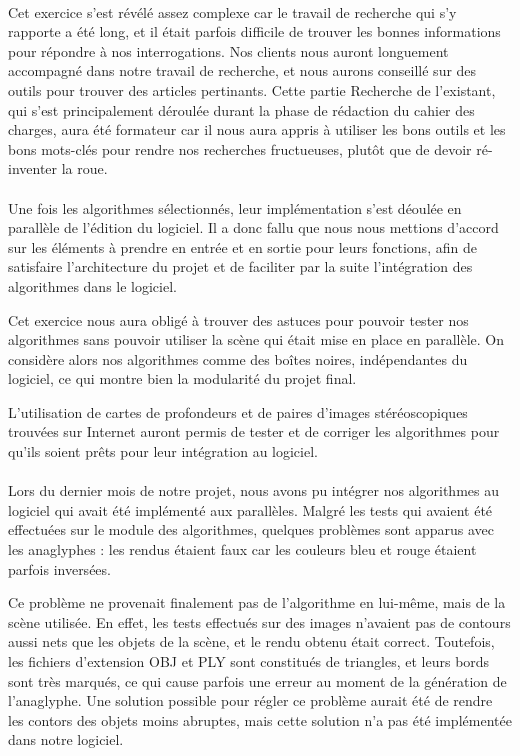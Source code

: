 \paragraph{}
Cet exercice s'est révélé assez complexe car le travail de recherche qui s'y rapporte a été long, et il était parfois difficile de trouver les bonnes informations pour répondre à nos interrogations. Nos clients nous auront longuement accompagné dans notre travail de recherche, et nous aurons conseillé sur des outils pour trouver des articles pertinants. Cette partie Recherche de l'existant, qui s'est principalement déroulée durant la phase de rédaction du cahier des charges, aura été formateur car il nous aura appris à utiliser les bons outils et les bons mots-clés pour rendre nos recherches fructueuses, plutôt que de devoir ré-inventer la roue.

\paragraph{}
Une fois les algorithmes sélectionnés, leur implémentation s'est déoulée en parallèle de l'édition du logiciel. Il a donc fallu que nous nous mettions d'accord sur les éléments à prendre en entrée et en sortie pour leurs fonctions, afin de satisfaire l'architecture du projet et de faciliter par la suite l'intégration des algorithmes dans le logiciel.

Cet exercice nous aura obligé à trouver des astuces pour pouvoir tester nos algorithmes sans pouvoir utiliser la scène qui était mise en place en parallèle. On considère alors nos algorithmes comme des boîtes noires, indépendantes du logiciel, ce qui montre bien la modularité du projet final.

L'utilisation de cartes de profondeurs et de paires d'images stéréoscopiques trouvées sur Internet auront permis de tester et de corriger les algorithmes pour qu'ils soient prêts pour leur intégration au logiciel.

\paragraph{}
Lors du dernier mois de notre projet, nous avons pu intégrer nos algorithmes au logiciel qui avait été implémenté aux parallèles. Malgré les tests qui avaient été effectuées sur le module des algorithmes, quelques problèmes sont apparus avec les anaglyphes : les rendus étaient faux car les couleurs bleu et rouge étaient parfois inversées.

Ce problème ne provenait finalement pas de l'algorithme en lui-même, mais de la scène utilisée. En effet, les tests effectués sur des images n'avaient pas de contours aussi nets que les objets de la scène, et le rendu obtenu était correct. Toutefois, les fichiers d'extension OBJ et PLY sont constitués de triangles, et leurs bords sont très marqués, ce qui cause parfois une erreur au moment de la génération de l'anaglyphe. Une solution possible pour régler ce problème aurait été de rendre les contors des objets moins abruptes, mais cette solution n'a pas été implémentée dans notre logiciel.

